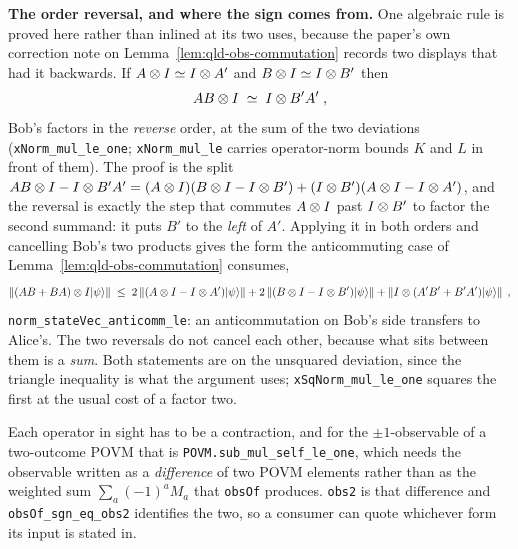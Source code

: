 \textbf{The order reversal, and where the sign comes from.} One algebraic rule is proved here
rather than inlined at its two uses, because the paper's own correction note on
Lemma~\ref{lem:qld-obs-commutation} records two displays that had it backwards. If
$A \otimes I \simeq I \otimes A'$ and $B \otimes I \simeq I \otimes B'$ then
\begin{equation}
  \label{eq:order-reversal-bp}
  AB \otimes I \;\simeq\; I \otimes B'A'\;,
\end{equation}
Bob's factors in the \emph{reverse} order, at the sum of the two deviations
(\texttt{xNorm\_mul\_le\_one}; \texttt{xNorm\_mul\_le} carries operator-norm bounds $K$ and $L$ in
front of them). The proof is the split
$AB \otimes I - I \otimes B'A' = (A \otimes I)(B \otimes I - I \otimes B') + (I \otimes B')(A \otimes I - I
\otimes A')$, and the reversal is exactly the step that commutes $A \otimes I$ past $I \otimes B'$ to
factor the second summand: it puts $B'$ to the \emph{left} of $A'$. Applying it in both orders
and cancelling Bob's two products gives the form the anticommuting case of
Lemma~\ref{lem:qld-obs-commutation} consumes,
\begin{equation}
  \label{eq:anticomm-transfer-bp}
  \left\| {(AB + BA) \otimes I |\psi\rangle} \right\| \;\leq\; 2 \left\| {(A \otimes I - I \otimes A')|\psi\rangle} \right\|
    + 2 \left\| {(B \otimes I - I \otimes B')|\psi\rangle} \right\|
    + \left\| {I \otimes (A'B' + B'A') |\psi\rangle} \right\|\;,
\end{equation}
\texttt{norm\_stateVec\_anticomm\_le}: an anticommutation on Bob's side transfers to Alice's. The
two reversals do not cancel each other, because what sits between them is a \emph{sum}. Both
statements are on the unsquared deviation, since the triangle inequality is what the argument
uses; \texttt{xSqNorm\_mul\_le\_one} squares the first at the usual cost of a factor two.

Each operator in sight has to be a contraction, and for the $\pm 1$-observable of a two-outcome
POVM that is \texttt{POVM.sub\_mul\_self\_le\_one}, which needs the observable written as a
\emph{difference} of two POVM elements rather than as the weighted sum $\sum_a (-1)^a M_a$ that
\texttt{obsOf} produces. \texttt{obs2} is that difference and \texttt{obsOf\_sgn\_eq\_obs2}
identifies the two, so a consumer can quote whichever form its input is stated in.

